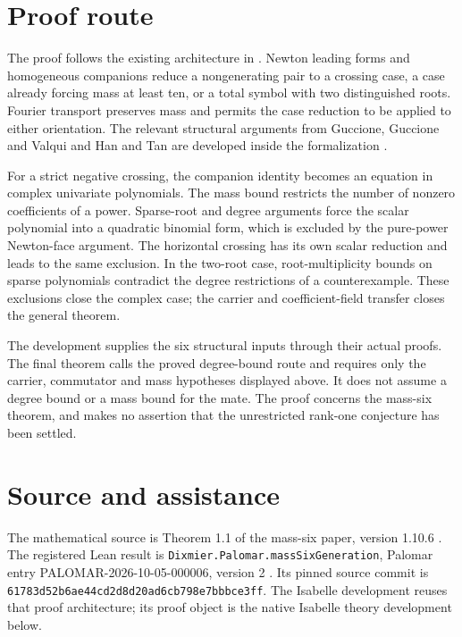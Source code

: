 \documentclass[11pt,a4paper]{article}
\begin{document}
\section{Proof route}
The proof follows the existing architecture in
\cite{Shaik2026Paper,Shaik2026Lean}. Newton leading forms and homogeneous
companions reduce a nongenerating pair to a crossing case, a case already
forcing mass at least ten, or a total symbol with two distinguished roots.
Fourier transport preserves mass and permits the case reduction to be
applied to either orientation. The relevant structural arguments from
Guccione, Guccione and Valqui and Han and Tan are developed inside the
formalization \cite{GGV2014,GGV2025,HanTan2024}.

For a strict negative crossing, the companion identity becomes an equation
in complex univariate polynomials. The mass bound restricts the number of
nonzero coefficients of a power. Sparse-root and degree arguments force
the scalar polynomial into a quadratic binomial form, which is excluded by
the pure-power Newton-face argument. The horizontal crossing has its own
scalar reduction and leads to the same exclusion. In the two-root case,
root-multiplicity bounds on sparse polynomials contradict the degree
restrictions of a counterexample. These exclusions close the complex case;
the carrier and coefficient-field transfer closes the general theorem.

The development supplies the six structural inputs through their actual
proofs. The final theorem calls the proved degree-bound route and requires
only the carrier, commutator and mass hypotheses displayed above. It does
not assume a degree bound or a mass bound for the mate. The proof concerns
the mass-six theorem, and makes no assertion that the unrestricted
rank-one conjecture has been settled.

\section{Source and assistance}
The mathematical source is Theorem 1.1 of the mass-six paper, version 1.10.6
\cite{Shaik2026Paper}. The registered Lean result is
\texttt{Dixmier.\allowbreak Palomar.\allowbreak massSixGeneration}, Palomar entry
PALOMAR-2026-10-05-000006, version 2 \cite{Shaik2026Lean}. Its pinned source
commit is \nolinkurl{61783d52b6ae44cd2d8d20ad6cb798e7bbbce3ff}.
The Isabelle development reuses that proof architecture; its proof object
is the native Isabelle theory development below.
\end{document}
